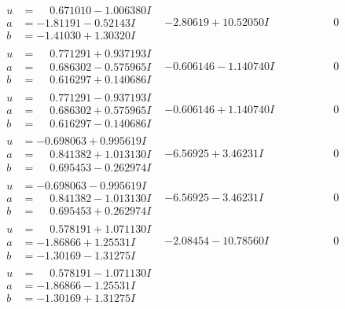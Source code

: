 \documentclass[1p]{elsarticle_modified}
\theoremstyle{definition}
\begin{document}
$$\begin{array}{c|c|c}
\begin{aligned}
u &= \phantom{-}0.671010 - 1.006380 I \\
a &= -1.81191 - 0.52143 I \\
b &= -1.41030 + 1.30320 I\end{aligned}
 & -2.80619 + 10.52050 I & \phantom{-0.000000 } 0 \\ \hline\begin{aligned}
u &= \phantom{-}0.771291 + 0.937193 I \\
a &= \phantom{-}0.686302 - 0.575965 I \\
b &= \phantom{-}0.616297 + 0.140686 I\end{aligned}
 & -0.606146 - 1.140740 I & \phantom{-0.000000 } 0 \\ \hline\begin{aligned}
u &= \phantom{-}0.771291 - 0.937193 I \\
a &= \phantom{-}0.686302 + 0.575965 I \\
b &= \phantom{-}0.616297 - 0.140686 I\end{aligned}
 & -0.606146 + 1.140740 I & \phantom{-0.000000 } 0 \\ \hline\begin{aligned}
u &= -0.698063 + 0.995619 I \\
a &= \phantom{-}0.841382 + 1.013130 I \\
b &= \phantom{-}0.695453 - 0.262974 I\end{aligned}
 & -6.56925 + 3.46231 I & \phantom{-0.000000 } 0 \\ \hline\begin{aligned}
u &= -0.698063 - 0.995619 I \\
a &= \phantom{-}0.841382 - 1.013130 I \\
b &= \phantom{-}0.695453 + 0.262974 I\end{aligned}
 & -6.56925 - 3.46231 I & \phantom{-0.000000 } 0 \\ \hline\begin{aligned}
u &= \phantom{-}0.578191 + 1.071130 I \\
a &= -1.86866 + 1.25531 I \\
b &= -1.30169 - 1.31275 I\end{aligned}
 & -2.08454 - 10.78560 I & \phantom{-0.000000 } 0 \\ \hline\begin{aligned}
u &= \phantom{-}0.578191 - 1.071130 I \\
a &= -1.86866 - 1.25531 I \\
b &= -1.30169 + 1.31275 I\end{aligned}

\end{array}$$
\end{document}
